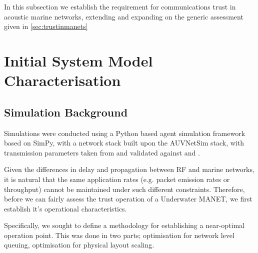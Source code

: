 \documentclass[runningheads,a4paper]{llncs}
\begin{document}
In this subsection we establish the requirement for communications trust in acoustic marine networks, extending and expanding on the generic assessment given in \ref{sec:trustinmanets}

\section{Initial System Model Characterisation}\label{sec:initialsystemcharacterisation}

\subsection{Simulation Background}

Simulations were conducted using a Python based agent simulation framework based on SimPy\cite{Mueller2003SimPy}, with a network stack built upon the AUVNetSim stack\cite{Miquel2008}, with transmission parameters taken from and validated against \cite{Stojanovic2007} and \cite{Stefanov2011}.

Given the differences in delay and propagation between RF and marine networks, it is natural that the same application rates (e.g. packet emission rates or throughput) cannot be maintained under such different constraints. 
Therefore, before we can fairly assess the trust operation of a Underwater MANET, we first establish it's operational characteristics. 

Specifically, we sought to define a methodology for establishing a near-optimal operation point. This was done in two parts; optimisation for network level queuing, optimisation for physical layout scaling.
\end{document}
